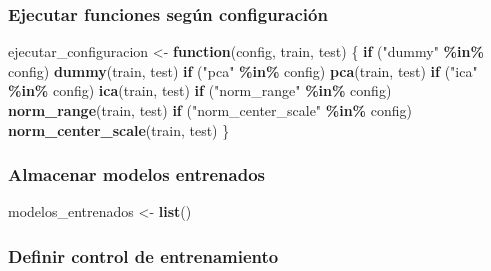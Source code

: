 \documentclass[
]{article}
\newenvironment{Shaded}{\begin{snugshade}}{\end{snugshade}}
\newcommand{\ControlFlowTok}[1]{\textcolor[rgb]{0.13,0.29,0.53}{\textbf{#1}}}
\newcommand{\FunctionTok}[1]{\textcolor[rgb]{0.13,0.29,0.53}{\textbf{#1}}}
\newcommand{\NormalTok}[1]{#1}
\newcommand{\OtherTok}[1]{\textcolor[rgb]{0.56,0.35,0.01}{#1}}
\newcommand{\SpecialCharTok}[1]{\textcolor[rgb]{0.81,0.36,0.00}{\textbf{#1}}}
\newcommand{\StringTok}[1]{\textcolor[rgb]{0.31,0.60,0.02}{#1}}
\begin{document}
\hypertarget{ejecutar-funciones-seguxfan-configuraciuxf3n}{%
\subsubsection{Ejecutar funciones según
configuración}\label{ejecutar-funciones-seguxfan-configuraciuxf3n}}

\begin{Shaded}
\begin{Highlighting}[]
\NormalTok{ejecutar\_configuracion }\OtherTok{\textless{}{-}} \ControlFlowTok{function}\NormalTok{(config, train, test) \{}
  \ControlFlowTok{if}\NormalTok{ (}\StringTok{"dummy"} \SpecialCharTok{\%in\%}\NormalTok{ config) }\FunctionTok{dummy}\NormalTok{(train, test)}
  \ControlFlowTok{if}\NormalTok{ (}\StringTok{"pca"} \SpecialCharTok{\%in\%}\NormalTok{ config) }\FunctionTok{pca}\NormalTok{(train, test)}
  \ControlFlowTok{if}\NormalTok{ (}\StringTok{"ica"} \SpecialCharTok{\%in\%}\NormalTok{ config) }\FunctionTok{ica}\NormalTok{(train, test)}
  \ControlFlowTok{if}\NormalTok{ (}\StringTok{"norm\_range"} \SpecialCharTok{\%in\%}\NormalTok{ config) }\FunctionTok{norm\_range}\NormalTok{(train, test)}
  \ControlFlowTok{if}\NormalTok{ (}\StringTok{"norm\_center\_scale"} \SpecialCharTok{\%in\%}\NormalTok{ config) }\FunctionTok{norm\_center\_scale}\NormalTok{(train, test)}
\NormalTok{\}}
\end{Highlighting}
\end{Shaded}

\hypertarget{almacenar-modelos-entrenados}{%
\subsubsection{Almacenar modelos
entrenados}\label{almacenar-modelos-entrenados}}

\begin{Shaded}
\begin{Highlighting}[]
\NormalTok{modelos\_entrenados }\OtherTok{\textless{}{-}} \FunctionTok{list}\NormalTok{()}
\end{Highlighting}
\end{Shaded}

\hypertarget{definir-control-de-entrenamiento}{%
\subsubsection{Definir control de
entrenamiento}\label{definir-control-de-entrenamiento}}
\end{document}

